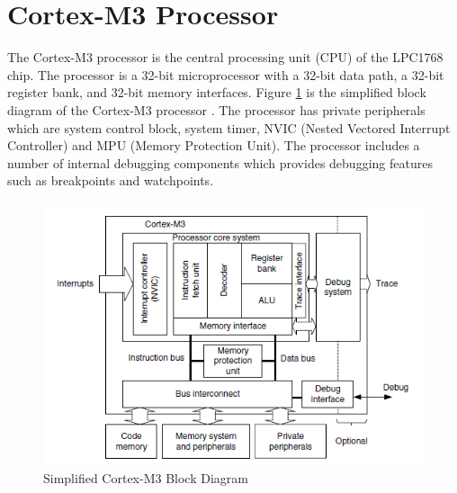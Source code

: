 \section{Cortex-M3 Processor}
\label{sec_cm3}

The Cortex-M3 processor is the central processing unit (CPU) of the LPC1768 chip.
The processor is a 32-bit microprocessor with a 32-bit data path, a 32-bit register bank, and 32-bit memory interfaces.
Figure \ref{fig_cm3_block} is the simplified block diagram of 
the Cortex-M3 processor \cite{yiu2009definitive}.
The processor has private peripherals which are system control block, system timer, NVIC (Nested Vectored Interrupt Controller) and MPU (Memory Protection Unit).
The processor includes a number of internal debugging components which provides
debugging features such as breakpoints and watchpoints.

\begin{figure}
\centerline{\includegraphics[width=5in]{figure/CortexM3_Processor}}
\caption[Simplified Cortex-M3 Block Diagram] {Simplified Cortex-M3 Block Diagram\cite{yiu2009definitive}}
\label{fig_cm3_block}
\end{figure}

